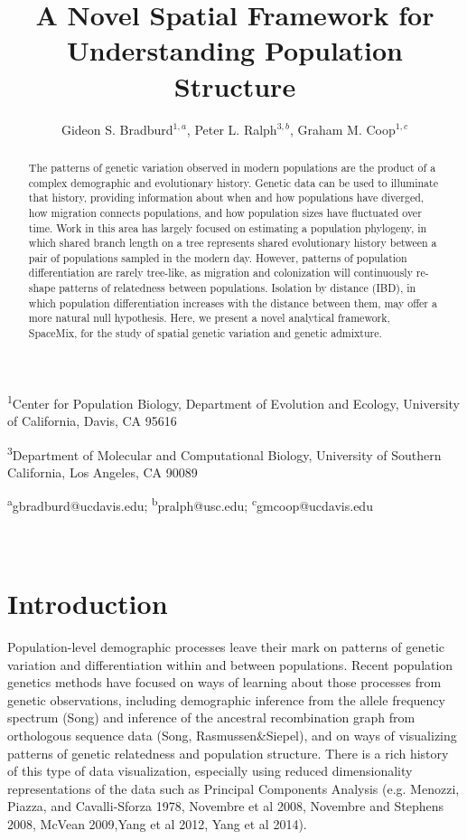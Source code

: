 \documentclass[12pt]{article}
\title{A Novel Spatial Framework for Understanding Population Structure}
\date{\vspace{-5ex}}
\author{Gideon S. Bradburd$^{1,a}$, Peter L. Ralph$^{3,b}$, Graham M. Coop$^{1,c}$}
\begin{document}
\maketitle

\textsuperscript{1}Center for Population Biology, Department of Evolution and Ecology, University of California, Davis, CA 95616

\textsuperscript{3}Department of Molecular and Computational Biology, University of Southern California, Los Angeles, CA 90089

\textsuperscript{a}gbradburd@ucdavis.edu; 
\textsuperscript{b}pralph@usc.edu;
\textsuperscript{c}gmcoop@ucdavis.edu\\\\\

\newpage

\begin{abstract}
The patterns of genetic variation observed in modern populations are the product of a complex demographic and evolutionary history.  Genetic data can be used to illuminate that history, providing information about when and how populations have diverged, how migration connects populations, and how population sizes have fluctuated over time.  Work in this area has largely focused on estimating a population phylogeny, in which shared branch length on a tree represents shared evolutionary history between a pair of populations sampled in the modern day.  However, patterns of population differentiation are rarely tree-like, as migration and colonization will continuously re-shape patterns of relatedness between populations.  Isolation by distance (IBD), in which population differentiation increases with the distance between them, may offer a more natural null hypothesis.  Here, we present a novel analytical framework, SpaceMix, for the study of spatial genetic variation and genetic admixture.
\end{abstract}

\newpage
\section*{Introduction}

Population-level demographic processes leave their mark on patterns of genetic variation and differentiation within and between populations.  Recent population genetics methods have focused on ways of learning about those processes from genetic observations, including demographic inference from the allele frequency spectrum (Song) and inference of the ancestral recombination graph from orthologous sequence data (Song, Rasmussen\&Siepel), and on ways of visualizing patterns of genetic relatedness and population structure.  There is a rich history of this type of data visualization, especially using reduced dimensionality representations of the data such as Principal Components Analysis (e.g. Menozzi, Piazza, and Cavalli-Sforza 1978, Novembre et al 2008, Novembre and Stephens 2008, McVean 2009,Yang et al 2012, Yang et al 2014).
\end{document}
